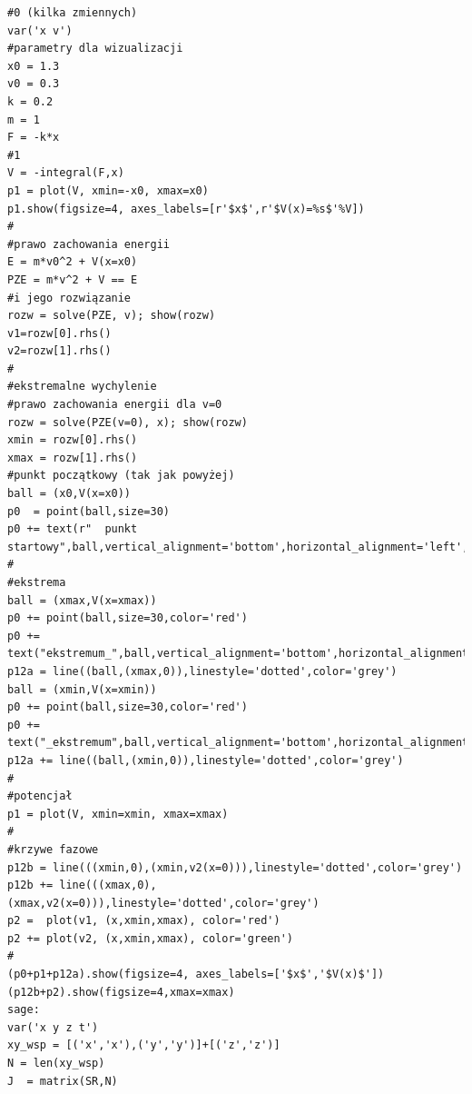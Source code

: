 \documentclass[a4paper,12pt,polish]{sphinxmanual}
\begin{document}
\begin{verbatim}
#0 (kilka zmiennych)
var('x v')
#parametry dla wizualizacji
x0 = 1.3
v0 = 0.3
k = 0.2
m = 1
F = -k*x
#1
V = -integral(F,x)
p1 = plot(V, xmin=-x0, xmax=x0)
p1.show(figsize=4, axes_labels=[r'$x$',r'$V(x)=%s$'%V])
#
#prawo zachowania energii
E = m*v0^2 + V(x=x0)
PZE = m*v^2 + V == E
#i jego rozwiązanie
rozw = solve(PZE, v); show(rozw)
v1=rozw[0].rhs()
v2=rozw[1].rhs()
#
#ekstremalne wychylenie
#prawo zachowania energii dla v=0
rozw = solve(PZE(v=0), x); show(rozw)
xmin = rozw[0].rhs()
xmax = rozw[1].rhs()
#punkt początkowy (tak jak powyżej)
ball = (x0,V(x=x0))
p0  = point(ball,size=30)
p0 += text(r"  punkt startowy",ball,vertical_alignment='bottom',horizontal_alignment='left',fontsize=8)
#
#ekstrema
ball = (xmax,V(x=xmax))
p0 += point(ball,size=30,color='red')
p0 += text("ekstremum_",ball,vertical_alignment='bottom',horizontal_alignment='right',color='red',fontsize=8)
p12a = line((ball,(xmax,0)),linestyle='dotted',color='grey')
ball = (xmin,V(x=xmin))
p0 += point(ball,size=30,color='red')
p0 += text("_ekstremum",ball,vertical_alignment='bottom',horizontal_alignment='left',color='red',fontsize=8)
p12a += line((ball,(xmin,0)),linestyle='dotted',color='grey')
#
#potencjał
p1 = plot(V, xmin=xmin, xmax=xmax)
#
#krzywe fazowe
p12b = line(((xmin,0),(xmin,v2(x=0))),linestyle='dotted',color='grey')
p12b += line(((xmax,0),(xmax,v2(x=0))),linestyle='dotted',color='grey')
p2 =  plot(v1, (x,xmin,xmax), color='red')
p2 += plot(v2, (x,xmin,xmax), color='green')
#
(p0+p1+p12a).show(figsize=4, axes_labels=['$x$','$V(x)$'])
(p12b+p2).show(figsize=4,xmax=xmax)
sage:
var('x y z t')
xy_wsp = [('x','x'),('y','y')]+[('z','z')]
N = len(xy_wsp)
J  = matrix(SR,N)
\end{verbatim}
\end{document}
